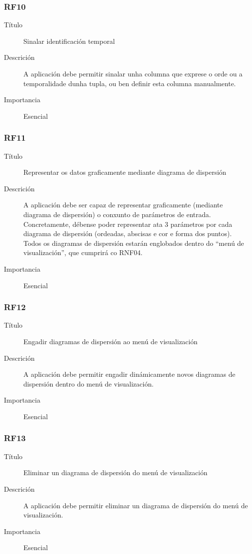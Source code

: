 \subsubsection*{RF10}
\begin{description}
\item[Título] \hfill
Sinalar identificación temporal
\item[Descrición] \hfill
A aplicación debe permitir sinalar unha columna que exprese o orde ou a temporalidade dunha tupla, ou ben definir esta columna manualmente.
\item[Importancia] \hfill
Esencial
\end{description}

\subsubsection*{RF11}
\begin{description}
\item[Título] \hfill
Representar os datos graficamente mediante diagrama de dispersión
\item[Descrición] \hfill
A aplicación debe ser capaz de representar graficamente (mediante diagrama de dispersión) o conxunto de parámetros de entrada. Concretamente, débense poder representar ata 3 parámetros por cada diagrama de dispersión (ordeadas, abscisas e cor e forma dos puntos). Todos os diagramas de dispersión estarán englobados dentro do ``menú de visualización'', que cumprirá co RNF04.
\item[Importancia] \hfill
Esencial
\end{description}

\subsubsection*{RF12}
\begin{description}
\item[Título] \hfill
Engadir diagramas de dispersión ao menú de visualización
\item[Descrición] \hfill
A aplicación debe permitir engadir dinámicamente novos diagramas de dispersión dentro do menú de visualización.
\item[Importancia] \hfill
Esencial
\end{description}

\subsubsection*{RF13}
\begin{description}
\item[Título] \hfill
Eliminar un diagrama de dispersión do menú de visualización
\item[Descrición] \hfill
A aplicación debe permitir eliminar un diagrama de dispersión do menú de visualización.
\item[Importancia] \hfill
Esencial
\end{description}

